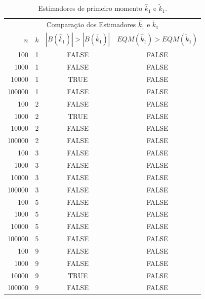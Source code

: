 \documentclass[12pt]{article}
\begin{document}
\begin{table}[h]
  \label{tab:gamma_r_m1}
  \centering
  \begin{tabular}{rccc}
    \toprule
    \multicolumn{4}{c}{Comparação dos Estimadores $\hat{k}_1$ e $\tilde{k}_1$}\\
    $n$ & $k$ & $|B(\hat{k}_1)|>|B(\tilde{k_1})|$ & $EQM(\hat{k}_1)>EQM(\tilde{k}_1)$ \\
    \midrule
    100 & 1 & FALSE & FALSE\\
    1000 & 1 & FALSE & FALSE\\
    10000 & 1 & TRUE & FALSE\\
    100000 & 1 & FALSE & FALSE\\
    100 & 2 & FALSE & FALSE\\
    1000 & 2 & TRUE & FALSE\\
    10000 & 2 & FALSE & FALSE\\
    100000 & 2 & FALSE & FALSE\\
    100 & 3 & FALSE & FALSE\\
    1000 & 3 & FALSE & FALSE\\
    10000 & 3 & FALSE & FALSE\\
    100000 & 3 & FALSE & FALSE\\
    100 & 5 & FALSE & FALSE\\
    1000 & 5 & FALSE & FALSE\\
    10000 & 5 & FALSE & FALSE\\
    100000 & 5 & FALSE & FALSE\\
    100 & 9 & FALSE & FALSE\\
    1000 & 9 & FALSE & FALSE\\
    10000 & 9 & TRUE & FALSE\\
    100000 & 9 & FALSE & FALSE\\
    \bottomrule
  \end{tabular}
  \caption{Estimadores de primeiro momento $\hat{k}_1$ e $\tilde{k}_1$.}
\end{table}
\end{document}
